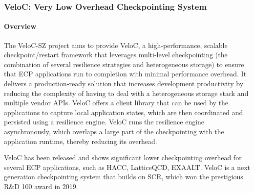 \subsubsection{ VeloC: Very Low Overhead Checkpointing System} 

\paragraph{Overview} 

The VeloC-SZ project aims to provide VeloC, a high-performance, scalable
checkpoint/restart framework that leverages multi-level checkpointing
(the combination of several resilience strategies and heterogeneous
storage) to ensure that ECP applications run to completion with
minimal performance overhead. It delivers a production-ready solution
that increases development productivity by reducing the complexity of
having to deal with a heterogeneous storage stack and multiple vendor
APIs. VeloC offers a client library that can be used by the
applications to capture local application states, which are then
coordinated and persisted using a resilience engine.  VeloC runs the resilience engine asynchronously, which overlaps a large part of the checkpointing
with the application runtime, thereby reducing its overhead.

VeloC has been released and shows significant lower checkpointing
overhead for several ECP applications, such as HACC, LatticeQCD, 
EXAALT. VeloC is a next generation checkpointing system that builds on SCR, which won the prestigious R&D 100 award in 2019. 

